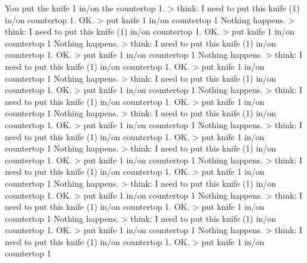 \documentclass[
]{article}
\newenvironment{Shaded}{}{}
\newcommand{\NormalTok}[1]{#1}
\begin{document}
\begin{Shaded}
\begin{Highlighting}[]
\NormalTok{You put the knife 1 in/on the countertop 1.}
\NormalTok{\textgreater{} think: I need to put this knife (1) in/on countertop 1.}
\NormalTok{OK.}
\NormalTok{\textgreater{} put knife 1 in/on countertop 1}
\NormalTok{Nothing happens.}
\NormalTok{\textgreater{} think: I need to put this knife (1) in/on countertop 1.}
\NormalTok{OK.}
\NormalTok{\textgreater{} put knife 1 in/on countertop 1}
\NormalTok{Nothing happens.}
\NormalTok{\textgreater{} think: I need to put this knife (1) in/on countertop 1.}
\NormalTok{OK.}
\NormalTok{\textgreater{} put knife 1 in/on countertop 1}
\NormalTok{Nothing happens.}
\NormalTok{\textgreater{} think: I need to put this knife (1) in/on countertop 1.}
\NormalTok{OK.}
\NormalTok{\textgreater{} put knife 1 in/on countertop 1}
\NormalTok{Nothing happens.}
\NormalTok{\textgreater{} think: I need to put this knife (1) in/on countertop 1.}
\NormalTok{OK.}
\NormalTok{\textgreater{} put knife 1 in/on countertop 1}
\NormalTok{Nothing happens.}
\NormalTok{\textgreater{} think: I need to put this knife (1) in/on countertop 1.}
\NormalTok{OK.}
\NormalTok{\textgreater{} put knife 1 in/on countertop 1}
\NormalTok{Nothing happens.}
\NormalTok{\textgreater{} think: I need to put this knife (1) in/on countertop 1.}
\NormalTok{OK.}
\NormalTok{\textgreater{} put knife 1 in/on countertop 1}
\NormalTok{Nothing happens.}
\NormalTok{\textgreater{} think: I need to put this knife (1) in/on countertop 1.}
\NormalTok{OK.}
\NormalTok{\textgreater{} put knife 1 in/on countertop 1}
\NormalTok{Nothing happens.}
\NormalTok{\textgreater{} think: I need to put this knife (1) in/on countertop 1.}
\NormalTok{OK.}
\NormalTok{\textgreater{} put knife 1 in/on countertop 1}
\NormalTok{Nothing happens.}
\NormalTok{\textgreater{} think: I need to put this knife (1) in/on countertop 1.}
\NormalTok{OK.}
\NormalTok{\textgreater{} put knife 1 in/on countertop 1}
\NormalTok{Nothing happens.}
\NormalTok{\textgreater{} think: I need to put this knife (1) in/on countertop 1.}
\NormalTok{OK.}
\NormalTok{\textgreater{} put knife 1 in/on countertop 1}
\NormalTok{Nothing happens.}
\NormalTok{\textgreater{} think: I need to put this knife (1) in/on countertop 1.}
\NormalTok{OK.}
\NormalTok{\textgreater{} put knife 1 in/on countertop 1}
\NormalTok{Nothing happens.}
\NormalTok{\textgreater{} think: I need to put this knife (1) in/on countertop 1.}
\NormalTok{OK.}
\NormalTok{\textgreater{} put knife 1 in/on countertop 1}
\NormalTok{Nothing happens.}
\NormalTok{\textgreater{} think: I need to put this knife (1) in/on countertop 1.}
\NormalTok{OK.}
\NormalTok{\textgreater{} put knife 1 in/on countertop 1}

\end{Highlighting}
\end{Shaded}
\end{document}
